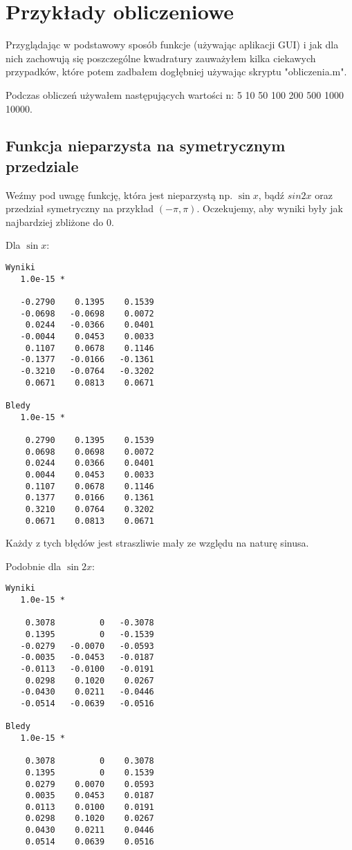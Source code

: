 \documentclass[12pt]{article}
\begin{document}
\section{Przykłady obliczeniowe}

Przyglądając w podstawowy sposób funkcje (używając aplikacji GUI) i jak dla nich zachowują się poszczególne kwadratury zauważyłem kilka ciekawych przypadków, które potem zadbałem dogłębniej używając skryptu "obliczenia.m".

Podczas obliczeń używałem następujących wartości n: 5 10 50 100 200 500 1000 10000.

\subsection{Funkcja nieparzysta na symetrycznym przedziale}

Weźmy pod uwagę funkcję, która jest nieparzystą np. $\sin{x}$, bądź $sin{2x}$ oraz przedział symetryczny na przykład $(-\pi, \pi)$.
Oczekujemy, aby wyniki były jak najbardziej zbliżone do 0.

Dla $\sin{x}$:
\begin{lstlisting}
Wyniki
   1.0e-15 *

   -0.2790    0.1395    0.1539
   -0.0698   -0.0698    0.0072
    0.0244   -0.0366    0.0401
   -0.0044    0.0453    0.0033
    0.1107    0.0678    0.1146
   -0.1377   -0.0166   -0.1361
   -0.3210   -0.0764   -0.3202
    0.0671    0.0813    0.0671

Bledy
   1.0e-15 *

    0.2790    0.1395    0.1539
    0.0698    0.0698    0.0072
    0.0244    0.0366    0.0401
    0.0044    0.0453    0.0033
    0.1107    0.0678    0.1146
    0.1377    0.0166    0.1361
    0.3210    0.0764    0.3202
    0.0671    0.0813    0.0671

\end{lstlisting}

Każdy z tych błędów jest straszliwie mały ze względu na naturę sinusa.

Podobnie dla $\sin{2x}$:
\begin{lstlisting}
Wyniki
   1.0e-15 *

    0.3078         0   -0.3078
    0.1395         0   -0.1539
   -0.0279   -0.0070   -0.0593
   -0.0035   -0.0453   -0.0187
   -0.0113   -0.0100   -0.0191
    0.0298    0.1020    0.0267
   -0.0430    0.0211   -0.0446
   -0.0514   -0.0639   -0.0516

Bledy
   1.0e-15 *

    0.3078         0    0.3078
    0.1395         0    0.1539
    0.0279    0.0070    0.0593
    0.0035    0.0453    0.0187
    0.0113    0.0100    0.0191
    0.0298    0.1020    0.0267
    0.0430    0.0211    0.0446
    0.0514    0.0639    0.0516
\end{lstlisting}
\end{document}
